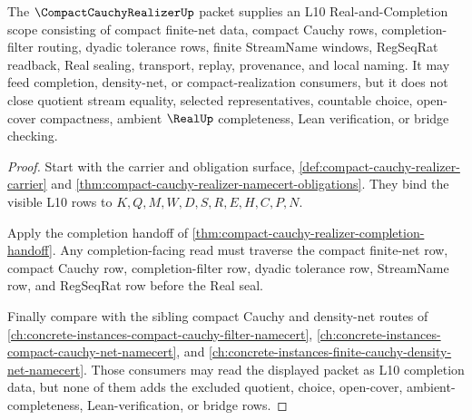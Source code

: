 \begin{theorem}
\label{thm:compact-cauchy-realizer-l10-scope}
The $\CompactCauchyRealizerUp$ packet supplies an L10 Real-and-Completion scope consisting of compact finite-net data, compact Cauchy rows, completion-filter routing, dyadic tolerance rows, finite StreamName windows, RegSeqRat readback, Real sealing, transport, replay, provenance, and local naming. It may feed completion, density-net, or compact-realization consumers, but it does not close quotient stream equality, selected representatives, countable choice, open-cover compactness, ambient $\RealUp$ completeness, Lean verification, or bridge checking.
\end{theorem}
\begin{proof}
Start with the carrier and obligation surface, \autoref{def:compact-cauchy-realizer-carrier} and \autoref{thm:compact-cauchy-realizer-namecert-obligations}. They bind the visible L10 rows to $K,Q,M,W,D,S,R,E,H,C,P,N$.

Apply the completion handoff of \autoref{thm:compact-cauchy-realizer-completion-handoff}. Any completion-facing read must traverse the compact finite-net row, compact Cauchy row, completion-filter row, dyadic tolerance row, StreamName row, and RegSeqRat row before the Real seal.

Finally compare with the sibling compact Cauchy and density-net routes of \autoref{ch:concrete-instances-compact-cauchy-filter-namecert}, \autoref{ch:concrete-instances-compact-cauchy-net-namecert}, and \autoref{ch:concrete-instances-finite-cauchy-density-net-namecert}. Those consumers may read the displayed packet as L10 completion data, but none of them adds the excluded quotient, choice, open-cover, ambient-completeness, Lean-verification, or bridge rows.
\end{proof}


